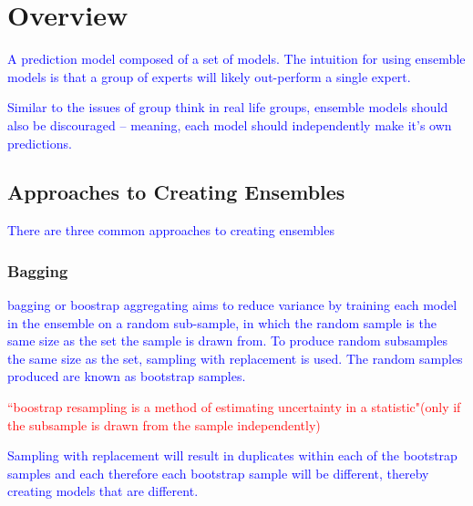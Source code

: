 \section{Overview}



\textcolor{blue}{A prediction model composed of a set of models. The intuition for using ensemble models is that a group of experts will likely out-perform a single expert.}

\textcolor{blue}{Similar to the issues of group think in real life groups, ensemble models should also be discouraged -- meaning, each model should independently make it's own predictions.}


\subsection{Approaches to Creating Ensembles}

\textcolor{blue}{There are three common approaches to creating ensembles}

\subsubsection{Bagging}

\textcolor{blue}{{bagging} or {boostrap aggregating} aims to reduce variance by training each model in the ensemble on a random sub-sample, in which the random sample is the same size as the set the sample is drawn from. To produce random subsamples the same size as the set, {sampling with replacement} is used. The random samples produced are known as {bootstrap samples}.}

\textcolor{red}{``boostrap resampling is a method of estimating uncertainty in a statistic"(only if the subsample is drawn from the sample independently)}

\textcolor{blue}{Sampling with replacement will result in duplicates within each of the bootstrap samples and each therefore each bootstrap sample will be different, thereby creating models that are different.}

